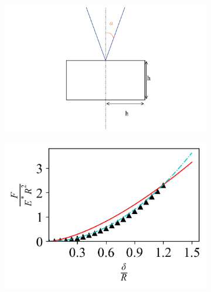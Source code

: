 \begin{figure}[H]
    \begin{subfigure}[t]{0.32\textwidth}
        \centering
        \caption{\label{fig: Cone-Plane-Setup}}
        \includegraphics[width=1\linewidth]{Figures/Cone-Plane-Setup.png}
    \end{subfigure}  
    \hfill  
    \begin{subfigure}[t]{0.32\textwidth}
        \centering
        \caption{\label{fig: Cone-Plane-Contact_Models} }
        \includegraphics[width=1\linewidth]{Figures/Cone-Plane-Contact_Models.png}
    \end{subfigure}
    \hfill
    \begin{subfigure}[t]{0.32\textwidth}
        \centering
        \caption{\label{fig: Cone-Plane-Young's_Modulus} }

\end{subfigure}
\end{figure}
